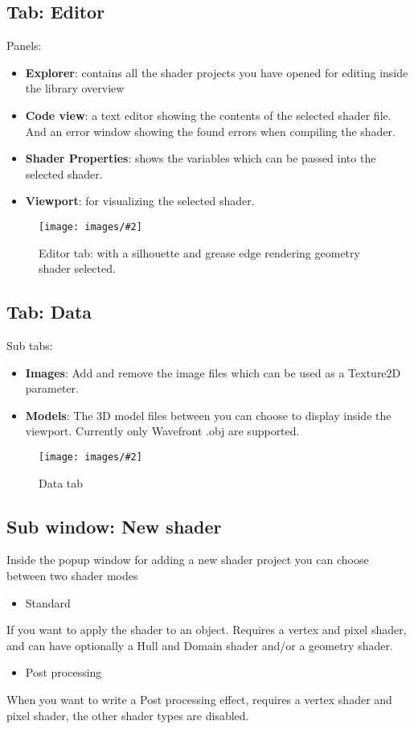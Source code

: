 \documentclass{paper}
\newlength{\imgwidth} %
\newcommand\scalegraphics[3][]
{
	\begin{figure}[H]
	\centering
	\settowidth{\imgwidth}{\texttt{[image: images/\#2]}} %
	\setlength{\imgwidth}{\minof{#1\imgwidth}{\textwidth}} %
	\texttt{[image: images/\#2]} %
	\caption{#3}
	\end{figure}
}
\begin{document}
\newpage
\subsection{Tab: Editor}\label{subsec:tab_e}
Panels:
\begin{itemize}
	\item \textbf{Explorer}: contains all the shader projects you have opened for editing inside the library overview
	\item \textbf{Code view}: a text editor showing the contents of the selected shader file. And an error window showing the found errors when compiling the shader.
	\item \textbf{Shader Properties}: shows the variables which can be passed into the selected shader.
	\item \textbf{Viewport}: for visualizing the selected shader.
\end{itemize}
\scalegraphics{editor.png}{Editor tab: with a silhouette and grease edge rendering geometry shader selected.}

\newpage
\subsection{Tab: Data}\label{subsec:tab_d}
Sub tabs:
\begin{itemize}
	\item \textbf{Images}: Add and remove the image files which can be used as a Texture2D parameter.
	\item \textbf{Models}: The 3D model files between you can choose to display inside the viewport. Currently only Wavefront .obj are supported.
\end{itemize}
\scalegraphics{data.png}{Data tab}

\newpage
\subsection{Sub window: New shader}\label{subsec:tab_d}
Inside the popup window for adding a new shader project you can choose between two shader modes
\begin{itemize}
\item Standard
\end{itemize}
If you want to apply the shader to an object. Requires a vertex and pixel shader, and can have optionally a Hull and Domain shader and/or a geometry shader.

\begin{itemize}
\item Post processing
\end{itemize}
When you want to write a Post processing effect, requires a vertex shader and pixel shader, the other shader types are disabled. 
\end{document}
